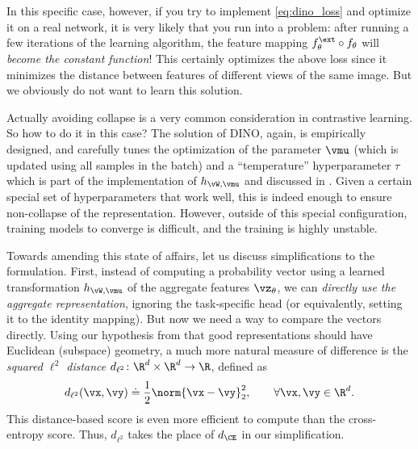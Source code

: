 \documentclass[../../book-main.tex]{subfiles}
\begin{document}
In this specific case, however, if you try to implement \eqref{eq:dino_loss} and optimize it on a real network, it is very likely that you run into a problem: after running a few iterations of the learning algorithm, the feature mapping \(f_{\theta}^{\ext} \circ f_{\theta}\) will \textit{become the constant function}! This certainly optimizes the above loss since it minimizes the distance between features of different views of the same image. But we obviously do not want to learn this solution. 

Actually avoiding collapse is a very common consideration in contrastive learning. So how to do it in this case? The solution of DINO, again, is empirically designed, and carefully tunes the optimization of the parameter \(\vmu\) (which is updated using all samples in the batch) and a ``temperature'' hyperparameter \(\tau\) which is part of the implementation of \(h_{\vW, \vmu}\) and discussed in . Given a certain special set of hyperparameters that work well, this is indeed enough to ensure non-collapse of the representation. However, outside of this special configuration, training models to converge is difficult, and the training is highly unstable. 

Towards amending this state of affairs, let us discuss simplifications to the formulation. First, instead of computing a probability vector using a learned transformation \(h_{\vW, \vmu}\) of the aggregate features \(\vz_{\theta}\), we can \textit{directly use the aggregate representation}, ignoring the task-specific head (or equivalently, setting it to the identity mapping). But now we need a way to compare the vectors directly. Using our hypothesis from  that good representations should have Euclidean (subspace) geometry, a much more natural measure of difference is the \textit{squared \(\ell^{2}\) distance} \(d_{\ell^{2}} \colon \R^{d} \times \R^{d} \to \R\), defined as 
\begin{equation}\label{eq:cosine_similarity}
    d_{\ell^{2}}(\vx, \vy) \doteq \frac{1}{2}\norm{\vx - \vy}_{2}^{2}, \qquad  \forall \vx, \vy \in \R^{d}.
\end{equation}
This distance-based score is even more efficient to compute than the cross-entropy score. Thus, \(d_{\ell^{2}}\) takes the place of \(d_{\CE}\) in our simplification. 
\end{document}
